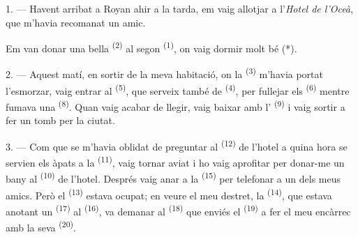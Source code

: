 %


\VUsaut{3.0mm}
\VUsaut{1.6mm}
\VUsaut{2.0mm}
\VUsaut{3.4mm}

1. --- Havent arribat a Royan ahir a la tarda, em vaig allotjar a l'\textit{Hotel
de l'Oceà}, que m'havia recomanat un amic.

Em van donar una bella  \textsuperscript{(2)} al segon
 \textsuperscript{(1)}, on vaig dormir molt bé (*).

2. --- Aquest matí, en sortir de la meva habitació, on la 
\textsuperscript{(3)} m'havia portat l'esmorzar, vaig entrar al  \textsuperscript{(5)}, que serveix també de 
\textsuperscript{(4)}, per fullejar els  \textsuperscript{(6)}
mentre fumava una  \textsuperscript{(8)}. Quan vaig acabar de
llegir, vaig baixar amb l' \textsuperscript{(9)} i vaig sortir a
fer un tomb per la ciutat.

3. --- Com que se m'havia oblidat de preguntar al 
\textsuperscript{(12)} de l'hotel a quina hora se servien els àpats a la
 \textsuperscript{(11)}, vaig tornar aviat i ho vaig aprofitar
per donar-me un bany al  \textsuperscript{(10)} de l'hotel. Després
vaig anar a la  \textsuperscript{(15)} per telefonar a un dels meus
amics. Però el  \textsuperscript{(13)} estava ocupat; en veure el
meu destret, la  \textsuperscript{(14)}, que estava anotant un
 \textsuperscript{(17)} al 
\textsuperscript{(16)}, va demanar al  \textsuperscript{(18)} que
enviés el  \textsuperscript{(19)} a fer el meu encàrrec amb la seva
 \textsuperscript{(20)}.

